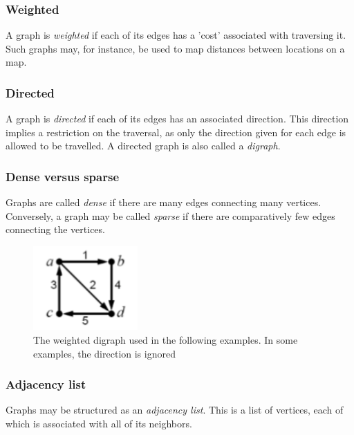 \documentclass{article}
\begin{document}
\subsubsection{Weighted}
A graph is {\em weighted} if each of its edges has a 'cost' associated with traversing it. Such graphs may,
for instance, be used to map distances between locations on a map.

\subsubsection{Directed}
A graph is {\em directed} if each of its edges has an associated direction. This direction implies a restriction
on the traversal, as only the direction given for each edge is allowed to be travelled. A directed graph is also
called a {\em digraph}.

\subsubsection{Dense versus sparse}
Graphs are called {\em dense} if there are many edges connecting many vertices. Conversely, a graph may be called
{\em sparse} if there are comparatively few edges connecting the vertices.

\begin{figure}[H]
  \centering
  \includegraphics[width=4cm]{weighted_directed_graph}
  \caption{The weighted digraph used in the following examples. In some examples, the direction is ignored}
\end{figure}

\subsubsection{Adjacency list}
Graphs may be structured as an {\em adjacency list}. This is a list of vertices, each of which is associated with
all of its neighbors.
\end{document}
